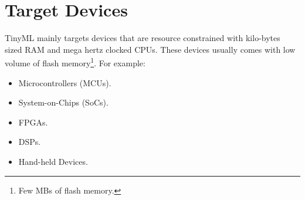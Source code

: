 \documentclass[../../main]{subfiles}
\begin{document}
\section{Target Devices} \label{sec:}

TinyML mainly targets devices that are resource constrained with
kilo-bytes sized RAM and mega hertz clocked CPUs. These devices
usually comes with low volume of flash memory\footnote{Few MBs of flash memory.}.
For example:

\begin{itemize}
    \item Microcontrollers (MCUs).
    \item System-on-Chips (SoCs).
    \item FPGAs.
    \item DSPs.
    \item Hand-held Devices.
\end{itemize}
\end{document}
